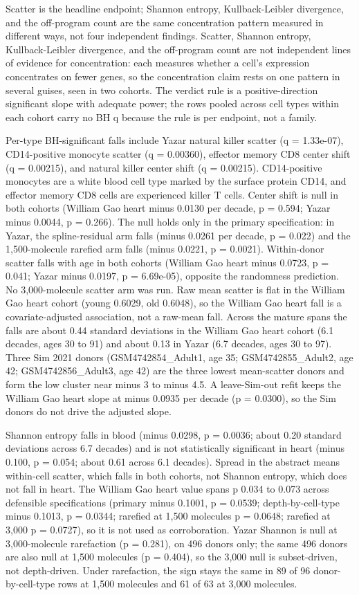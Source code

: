 \documentclass[11pt]{article}
\begin{document}
Scatter is the headline endpoint; Shannon entropy, Kullback-Leibler divergence, and the off-program count are the same concentration pattern measured in different ways, not four independent findings. Scatter, Shannon entropy, Kullback-Leibler divergence, and the off-program count are not independent lines of evidence for concentration: each measures whether a cell's expression concentrates on fewer genes, so the concentration claim rests on one pattern in several guises, seen in two cohorts. The verdict rule is a positive-direction significant slope with adequate power; the rows pooled across cell types within each cohort carry no BH q because the rule is per endpoint, not a family.

Per-type BH-significant falls include Yazar natural killer scatter (q = 1.33e-07), CD14-positive monocyte scatter (q = 0.00360), effector memory CD8 center shift (q = 0.00215), and natural killer center shift (q = 0.00215). CD14-positive monocytes are a white blood cell type marked by the surface protein CD14, and effector memory CD8 cells are experienced killer T cells. Center shift is null in both cohorts (William Gao heart minus 0.0130 per decade, p = 0.594; Yazar minus 0.0044, p = 0.266). The null holds only in the primary specification: in Yazar, the spline-residual arm falls (minus 0.0261 per decade, p = 0.022) and the 1,500-molecule rarefied arm falls (minus 0.0221, p = 0.0021). Within-donor scatter falls with age in both cohorts (William Gao heart minus 0.0723, p = 0.041; Yazar minus 0.0197, p = 6.69e-05), opposite the randomness prediction. No 3,000-molecule scatter arm was run. Raw mean scatter is flat in the William Gao heart cohort (young 0.6029, old 0.6048), so the William Gao heart fall is a covariate-adjusted association, not a raw-mean fall. Across the mature spans the falls are about 0.44 standard deviations in the William Gao heart cohort (6.1 decades, ages 30 to 91) and about 0.13 in Yazar (6.7 decades, ages 30 to 97). Three Sim 2021 donors (GSM4742854\_Adult1, age 35; GSM4742855\_Adult2, age 42; GSM4742856\_Adult3, age 42) are the three lowest mean-scatter donors and form the low cluster near minus 3 to minus 4.5. A leave-Sim-out refit keeps the William Gao heart slope at minus 0.0935 per decade (p = 0.0300), so the Sim donors do not drive the adjusted slope.

Shannon entropy falls in blood (minus 0.0298, p = 0.0036; about 0.20 standard deviations across 6.7 decades) and is not statistically significant in heart (minus 0.100, p = 0.054; about 0.61 across 6.1 decades). Spread in the abstract means within-cell scatter, which falls in both cohorts, not Shannon entropy, which does not fall in heart. The William Gao heart value spans p 0.034 to 0.073 across defensible specifications (primary minus 0.1001, p = 0.0539; depth-by-cell-type minus 0.1013, p = 0.0344; rarefied at 1,500 molecules p = 0.0648; rarefied at 3,000 p = 0.0727), so it is not used as corroboration. Yazar Shannon is null at 3,000-molecule rarefaction (p = 0.281), on 496 donors only; the same 496 donors are also null at 1,500 molecules (p = 0.404), so the 3,000 null is subset-driven, not depth-driven. Under rarefaction, the sign stays the same in 89 of 96 donor-by-cell-type rows at 1,500 molecules and 61 of 63 at 3,000 molecules.
\end{document}
